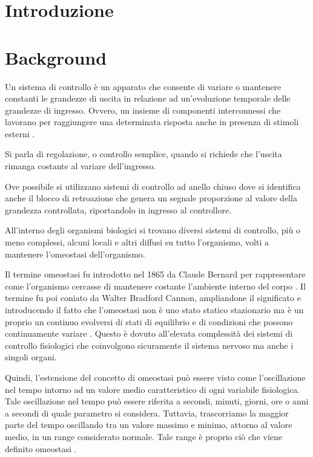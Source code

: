 \section{Introduzione}

\textcolor{blue}{\lipsum[1-2]}

\section{Background}

Un sistema di controllo è un apparato che consente di variare o mantenere constanti le grandezze di uscita in relazione ad un'evoluzione temporale delle grandezze di ingresso. Ovvero, un insieme di componenti interconnessi che lavorano per raggiungere una determinata risposta anche in presenza di stimoli esterni \cite{marro_controlli_2004}.  

Si parla di regolazione, o controllo semplice, quando si richiede che l'uscita rimanga costante al variare dell'ingresso.

Ove possibile si utilizzano sistemi di controllo ad anello chiuso dove si identifica anche il blocco di retroazione che genera un segnale proporzione al valore della grandezza controllata, riportandolo in ingresso al controllore.

All'interno degli organismi biologici si trovano diversi sistemi di controllo, più o meno complessi, alcuni locali e altri diffusi su tutto l'organismo, volti a mantenere l'omeostasi dell'organismo. 

Il termine omeostasi fu introdotto nel 1865 da Claude Bernard per rappresentare come l'organismo cercasse di mantenere costante l'ambiente interno del corpo \cite{bernard1957introduction}. Il termine fu poi coniato da Walter Bradford Cannon, ampliandone il significato e introducendo il fatto che l'omeostasi non è uno stato statico stazionario ma è un proprio un continuo evolversi di stati di equilibrio e di condizioni che possono continuamente variare \cite{cannon1939wisdom}. Questo è dovuto all'elevata complessità dei sistemi di controllo fisiologici che coinvolgono sicuramente il sistema nervoso ma anche i singoli organi. 

Quindi, l'estensione del concetto di omeostasi può essere visto come l'oscillazione nel tempo intorno ad un valore medio caratteristico di ogni variabile fisiologica. Tale oscillazione nel tempo può essere riferita a secondi, minuti, giorni, ore o anni a secondi di quale parametro si considera. Tuttavia, trascorriamo la maggior parte del tempo oscillando tra un valore massimo e minimo, attorno al valore medio, in un range considerato normale. Tale range è proprio ciò che viene definito omeostasi \cite{davies_adaptive_2016}. 




